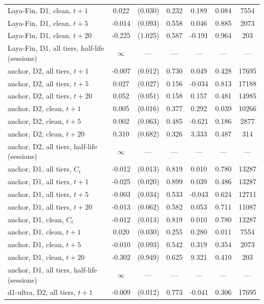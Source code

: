 \begin{longtable}{@{}lS[table-format=-1.3]S[table-format=1.3, table-space-text-pre=(, table-space-text-post=)]S[table-format=1.3]S[table-format=-1.3]S[table-format=1.3]S[table-format=5.0]@{}}
Laya-Fin, D1, clean, $t{+}1$ & 0.022 & {(}0.030{)} & 0.232 & 0.189 & 0.084 & 7554 \\
Laya-Fin, D1, clean, $t{+}5$ & -0.014 & {(}0.093{)} & 0.558 & 0.046 & 0.885 & 2073 \\
Laya-Fin, D1, clean, $t{+}20$ & -0.225 & {(}1.025{)} & 0.587 & -0.191 & 0.964 & 203 \\
Laya-Fin, D1, all tiers, half-life (sessions) & {$\infty$} & {---} & {---} & {---} & {---} & {---} \\
anchor, D2, all tiers, $t{+}1$ & -0.007 & {(}0.012{)} & 0.730 & 0.049 & 0.428 & 17695 \\
anchor, D2, all tiers, $t{+}5$ & 0.027 & {(}0.027{)} & 0.156 & -0.034 & 0.813 & 17188 \\
anchor, D2, all tiers, $t{+}20$ & 0.052 & {(}0.051{)} & 0.158 & 0.157 & 0.481 & 14985 \\
anchor, D2, clean, $t{+}1$ & 0.005 & {(}0.016{)} & 0.377 & 0.292 & 0.039 & 10266 \\
anchor, D2, clean, $t{+}5$ & 0.002 & {(}0.063{)} & 0.485 & -0.621 & 0.186 & 2877 \\
anchor, D2, clean, $t{+}20$ & 0.310 & {(}0.682{)} & 0.326 & 3.333 & 0.487 & 314 \\
anchor, D2, all tiers, half-life (sessions) & {$\infty$} & {---} & {---} & {---} & {---} & {---} \\
anchor, D1, all tiers, $C_t$ & -0.012 & {(}0.013{)} & 0.819 & 0.010 & 0.780 & 13287 \\
anchor, D1, all tiers, $t{+}1$ & -0.025 & {(}0.020{)} & 0.899 & 0.039 & 0.486 & 13287 \\
anchor, D1, all tiers, $t{+}5$ & -0.003 & {(}0.034{)} & 0.533 & -0.043 & 0.624 & 12711 \\
anchor, D1, all tiers, $t{+}20$ & -0.013 & {(}0.062{)} & 0.582 & 0.053 & 0.711 & 11087 \\
anchor, D1, clean, $C_t$ & -0.012 & {(}0.013{)} & 0.819 & 0.010 & 0.780 & 13287 \\
anchor, D1, clean, $t{+}1$ & 0.020 & {(}0.030{)} & 0.255 & 0.280 & 0.011 & 7554 \\
anchor, D1, clean, $t{+}5$ & -0.010 & {(}0.093{)} & 0.542 & 0.319 & 0.354 & 2073 \\
anchor, D1, clean, $t{+}20$ & -0.302 & {(}0.949{)} & 0.625 & 9.321 & 0.410 & 203 \\
anchor, D1, all tiers, half-life (sessions) & {$\infty$} & {---} & {---} & {---} & {---} & {---} \\
d1-ultra, D2, all tiers, $t{+}1$ & -0.009 & {(}0.012{)} & 0.773 & -0.041 & 0.306 & 17695 \\

\end{longtable}
